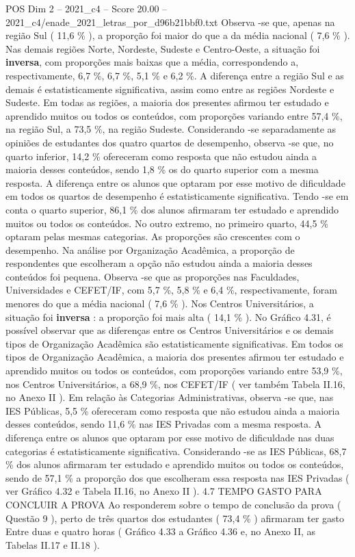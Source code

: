 \begin{textsample}{POS Dim 2 – 2021\_c4 – Score 20.00 – 2021\_c4/enade\_2021\_letras\_por\_d96b21bbf0.txt}
Observa -se que, apenas na região Sul ( 11,6 \% ), a proporção foi maior do que a da média nacional ( 7,6 \% ).
Nas demais regiões Norte, Nordeste, Sudeste e Centro-Oeste, a situação foi \textbf{inversa}, com proporções mais baixas que a média, correspondendo a, respectivamente, 6,7 \%, 6,7 \%, 5,1 \% e 6,2 \%.
A diferença entre a região Sul e as demais é estatisticamente significativa, assim como entre as regiões Nordeste e Sudeste.
Em todas as regiões, a maioria dos presentes afirmou ter estudado e aprendido muitos ou todos os conteúdos, com proporções variando entre 57,4 \%, na região Sul, a 73,5 \%, na região Sudeste.
Considerando -se separadamente as opiniões de estudantes dos quatro quartos de desempenho, observa -se que, no quarto inferior, 14,2 \% ofereceram como resposta que não estudou ainda a maioria desses conteúdos, sendo 1,8 \% os do quarto superior com a mesma resposta.
A diferença entre os alunos que optaram por esse motivo de dificuldade em todos os quartos de desempenho é estatisticamente significativa.
Tendo -se em conta o quarto superior, 86,1 \% dos alunos afirmaram ter estudado e aprendido muitos ou todos os conteúdos.
No outro extremo, no primeiro quarto, 44,5 \% optaram pelas mesmas categorias.
As proporções são crescentes com o desempenho.
Na análise por Organização Acadêmica, a proporção de respondentes que escolheram a opção não estudou ainda a maioria desses conteúdos foi pequena.
Observa -se que as proporções nas Faculdades, Universidades e CEFET/IF, com 5,7 \%, 5,8 \% e 6,4 \%, respectivamente, foram menores do que a média nacional ( 7,6 \% ).
Nos Centros Universitários, a situação foi \textbf{inversa} : a proporção foi mais alta ( 14,1 \% ).
No Gráfico 4.31, é possível observar que as diferenças entre os Centros Universitários e os demais tipos de Organização Acadêmica são estatisticamente significativas.
Em todos os tipos de Organização Acadêmica, a maioria dos presentes afirmou ter estudado e aprendido muitos ou todos os conteúdos, com proporções variando entre 53,9 \%, nos Centros Universitários, a 68,9 \%, nos CEFET/IF ( ver também Tabela II.16, no Anexo II ).
Em relação às Categorias Administrativas, observa -se que, nas IES Públicas, 5,5 \% ofereceram como resposta que não estudou ainda a maioria desses conteúdos, sendo 11,6 \% nas IES Privadas com a mesma resposta.
A diferença entre os alunos que optaram por esse motivo de dificuldade nas duas categorias é estatisticamente significativa.
Considerando -se as IES Públicas, 68,7 \% dos alunos afirmaram ter estudado e aprendido muitos ou todos os conteúdos, sendo de 57,1 \% a proporção dos que escolheram essa resposta nas IES Privadas ( ver Gráfico 4.32 e Tabela II.16, no Anexo II ). 4.7 TEMPO GASTO PARA CONCLUIR A PROVA Ao responderem sobre o tempo de conclusão da prova ( Questão 9 ), perto de três quartos dos estudantes ( 73,4 \% ) afirmaram ter gasto Entre duas e quatro horas ( Gráfico 4.33 a Gráfico 4.36 e, no Anexo II, as Tabelas II.17 e II.18 ).

\end{textsample}
